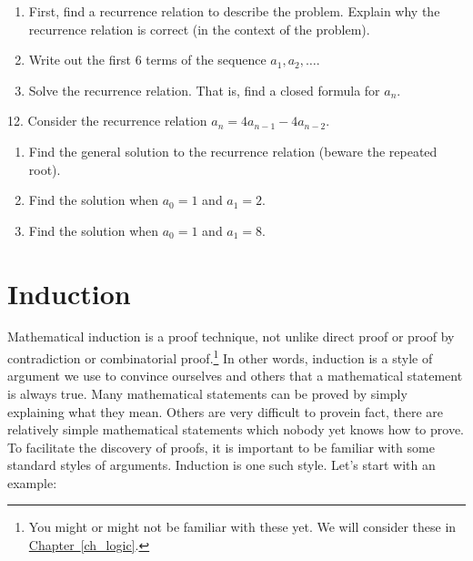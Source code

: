 \documentclass[12pt,]{book}
\theoremstyle{plain}
\theoremstyle{definition}
\theoremstyle{definition}
\theoremstyle{definition}
\numberwithin{equation}{chapter}
\begin{document}
\begin{exerciselist}
\leavevmode%
\begin{enumerate}[label=(\alph*)]
\item\hypertarget{li-187}{}\hypertarget{p-360}{}%
First, find a recurrence relation to describe the problem. Explain why the recurrence relation is correct (in the context of the problem). %
\item\hypertarget{li-188}{}\hypertarget{p-361}{}%
Write out the first 6 terms of the sequence \(a_1, a_2, \ldots\). %
\item\hypertarget{li-189}{}\hypertarget{p-362}{}%
Solve the recurrence relation. That is, find a closed formula for \(a_n\). %
\end{enumerate}
\par\smallskip
\item[12.]\hypertarget{exercise-44}{}\hypertarget{p-363}{}%
Consider the recurrence relation \(a_n = 4a_{n-1} - 4a_{n-2}\).%
\leavevmode%
\begin{enumerate}[label=(\alph*)]
\item\hypertarget{li-190}{}\hypertarget{p-364}{}%
Find the general solution to the recurrence relation (beware the repeated root). %
\item\hypertarget{li-191}{}\hypertarget{p-365}{}%
Find the solution when \(a_0 = 1\) and \(a_1 = 2\). %
\item\hypertarget{li-192}{}\hypertarget{p-366}{}%
Find the solution when \(a_0 = 1\) and \(a_1 = 8\). %
\end{enumerate}
\par\smallskip
\end{exerciselist}
\typeout{************************************************}
\typeout{************************************************}
\section[{Induction}]{Induction}\label{sec_seq-induction}
\hypertarget{p-367}{}%
 Mathematical induction is a proof technique, not unlike direct proof or proof by contradiction or combinatorial proof.\footnote{You might or might not be familiar with these yet.  We will consider these in \hyperref[ch_logic]{Chapter~\ref{ch_logic}}.\label{fn-3}} In other words, induction is a style of argument we use to convince ourselves and others that a mathematical statement is always true. Many mathematical statements can be proved by simply explaining what they mean. Others are very difficult to prove\textemdash{}in fact, there are relatively simple mathematical statements which nobody yet knows how to prove. To facilitate the discovery of proofs, it is important to be familiar with some standard styles of arguments. Induction is one such style. Let's start with an example:%
\typeout{************************************************}
\typeout{************************************************}
\end{document}
